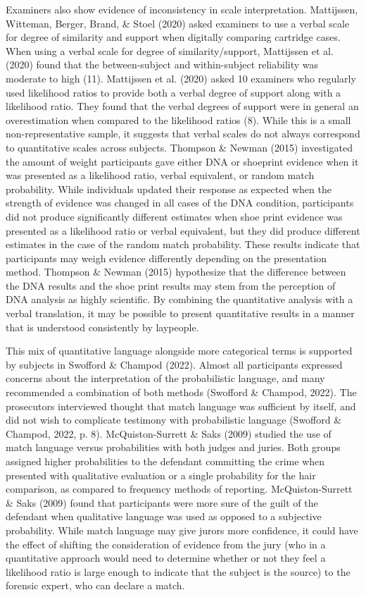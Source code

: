 \documentclass[print]{nuthesis}
\begin{document}
Examiners also show evidence of inconsistency in scale interpretation.
Mattijssen, Witteman, Berger, Brand, \& Stoel (2020) asked examiners to use a verbal scale for degree of similarity and support when digitally comparing cartridge cases.
When using a verbal scale for degree of similarity/support, Mattijssen et al. (2020) found that the between-subject and within-subject reliability was moderate to high (11).
Mattijssen et al. (2020) asked 10 examiners who regularly used likelihood ratios to provide both a verbal degree of support along with a likelihood ratio.
They found that the verbal degrees of support were in general an overestimation when compared to the likelihood ratios (8).
While this is a small non-representative sample, it suggests that verbal scales do not always correspond to quantitative scales across subjects.
Thompson \& Newman (2015) investigated the amount of weight participants gave either DNA or shoeprint evidence when it was presented as a likelihood ratio, verbal equivalent, or random match probability.
While individuals updated their response as expected when the strength of evidence was changed in all cases of the DNA condition, participants did not produce significantly different estimates when shoe print evidence was presented as a likelihood ratio or verbal equivalent, but they did produce different estimates in the case of the random match probability.
These results indicate that participants may weigh evidence differently depending on the presentation method.
Thompson \& Newman (2015) hypothesize that the difference between the DNA results and the shoe print results may stem from the perception of DNA analysis as highly scientific.
By combining the quantitative analysis with a verbal translation, it may be possible to present quantitative results in a manner that is understood consistently by laypeople.

This mix of quantitative language alongside more categorical terms is supported by subjects in Swofford \& Champod (2022).
Almost all participants expressed concerns about the interpretation of the probabilistic language, and many recommended a combination of both methods (Swofford \& Champod, 2022).
The prosecutors interviewed thought that match language was sufficient by itself, and did not wish to complicate testimony with probabilistic language (Swofford \& Champod, 2022, p. 8).
McQuiston-Surrett \& Saks (2009) studied the use of match language versus probabilities with both judges and juries.
Both groups assigned higher probabilities to the defendant committing the crime when presented with qualitative evaluation or a single probability for the hair comparison, as compared to frequency methods of reporting.
McQuiston-Surrett \& Saks (2009) found that participants were more sure of the guilt of the defendant when qualitative language was used as opposed to a subjective probability.
While match language may give jurors more confidence, it could have the effect of shifting the consideration of evidence from the jury (who in a quantitative approach would need to determine whether or not they feel a likelihood ratio is large enough to indicate that the subject is the source) to the forensic expert, who can declare a match.
\end{document}
